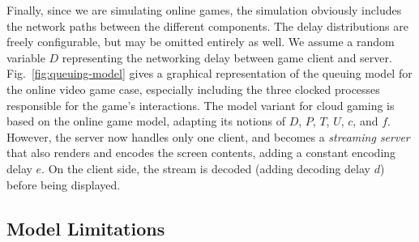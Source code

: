 
Finally, since we are simulating online games, the simulation obviously includes the network paths between the different components. The delay distributions are freely configurable, but may be omitted entirely as well. We assume a random variable $D$ representing the networking delay between game client and server. Fig.~\ref{fig:queuing-model} gives a graphical representation of the queuing model for the online video game case, especially including the three clocked processes responsible for the game's interactions. 
The model variant for cloud gaming is based on the online game model, adapting its notions of $D$, $P$, $T$, $U$, $c$, and $f$. However, the server now handles only one client, and becomes a \textit{streaming server} that also renders and encodes the screen contents, adding a constant encoding delay $e$. On the client side, the stream is decoded (adding decoding delay $d$) before being displayed.



\subsection{Model Limitations}


